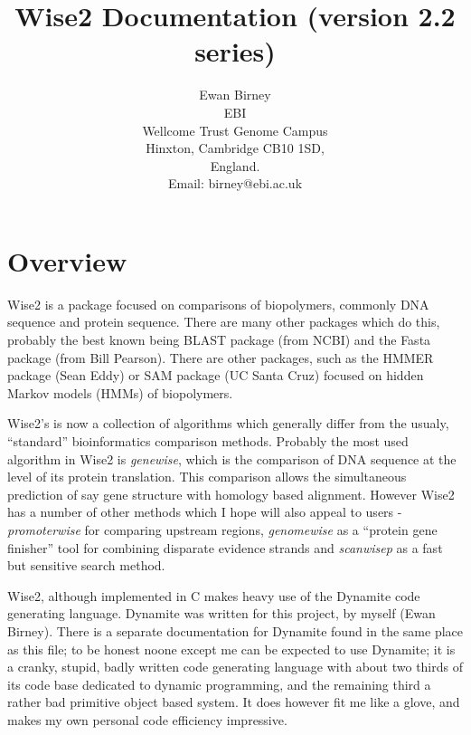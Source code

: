 \documentclass{article}
\begin{document}
\newcommand{\programtext}[1]{{\tt #1}}

\title{Wise2 Documentation (version 2.2 series)}
\author{Ewan Birney\\
EBI\\
Wellcome Trust Genome Campus\\
Hinxton, Cambridge CB10 1SD,\\
England.\\
Email: birney@ebi.ac.uk}

\maketitle
 
\newpage
\tableofcontents
\newpage

\section{Overview}

Wise2 is a package focused on comparisons of biopolymers, commonly DNA
sequence and protein sequence. There are many other packages which do
this, probably the best known being BLAST package (from NCBI) and the 
Fasta package (from Bill Pearson). There are other packages, such as
the HMMER package (Sean Eddy) or SAM package (UC Santa Cruz) focused
on hidden Markov models (HMMs) of biopolymers.

Wise2's is now a collection of algorithms which generally differ from
the usualy, ``standard'' bioinformatics comparison methods. Probably
the most used algorithm in Wise2 is \emph{genewise}, which is the
comparison of DNA sequence at the level of its protein
translation. This comparison allows the simultaneous prediction of say
gene structure with homology based alignment. However Wise2 has a number
of other methods which I hope will also appeal to users - \emph{promoterwise}
for comparing upstream regions, \emph{genomewise} as a ``protein gene finisher''
tool for combining disparate evidence strands and \emph{scanwisep} as a
fast but sensitive search method.


Wise2, although implemented in C makes heavy use of the Dynamite code
generating language. Dynamite was written for this project, by myself
(Ewan Birney). There is a separate documentation for Dynamite found in
the same place as this file; to be honest noone except me can be
expected to use Dynamite; it is a cranky, stupid, badly written code
generating language with about two thirds of its code base dedicated
to dynamic programming, and the remaining third a rather bad primitive
object based system. It does however fit me like a glove, and makes my
own personal code efficiency impressive.
\end{document}
